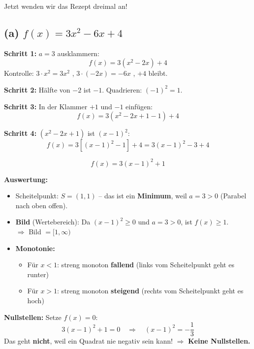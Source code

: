 \documentclass[12pt,a4paper]{article}
\begin{document}
\bigskip

Jetzt wenden wir das Rezept dreimal an!

\subsection{(a) $f(x) = 3x^2 - 6x + 4$}

\textbf{Schritt 1:} $a = 3$ ausklammern:
\[
  f(x) = 3\left(x^2 - 2x\right) + 4
\]
Kontrolle: $3 \cdot x^2 = 3x^2$ \checkmark, \quad $3 \cdot (-2x) = -6x$ \checkmark, \quad $+4$ bleibt.

\textbf{Schritt 2:} H\"alfte von $-2$ ist $-1$. Quadrieren: $(-1)^2 = 1$.

\textbf{Schritt 3:} In der Klammer $+1$ und $-1$ einf\"ugen:
\[
  f(x) = 3\left(x^2 - 2x + 1 - 1\right) + 4
\]

\textbf{Schritt 4:} $(x^2 - 2x + 1)$ ist $(x-1)^2$:
\[
  f(x) = 3\left[(x-1)^2 - 1\right] + 4 = 3(x-1)^2 - 3 + 4
\]

\[
  \boxed{f(x) = 3(x-1)^2 + 1}
\]

\textbf{Auswertung:}
\begin{itemize}
  \item Scheitelpunkt: $S = (1, 1)$ -- das ist ein \textbf{Minimum}, weil $a = 3 > 0$ (Parabel nach oben offen).
  \item \textbf{Bild} (Wertebereich): Da $(x-1)^2 \ge 0$ und $a = 3 > 0$, ist $f(x) \ge 1$.\\
        $\Rightarrow$ Bild $= [1, \infty)$
  \item \textbf{Monotonie:}
    \begin{itemize}
      \item F\"ur $x < 1$: streng monoton \textbf{fallend} (links vom Scheitelpunkt geht es runter)
      \item F\"ur $x > 1$: streng monoton \textbf{steigend} (rechts vom Scheitelpunkt geht es hoch)
    \end{itemize}
\end{itemize}

\textbf{Nullstellen:} Setze $f(x) = 0$:
\[
  3(x-1)^2 + 1 = 0 \quad\Longrightarrow\quad (x-1)^2 = -\frac{1}{3}
\]
Das geht \textbf{nicht}, weil ein Quadrat nie negativ sein kann! $\Rightarrow$ \textbf{Keine Nullstellen.}
\end{document}
